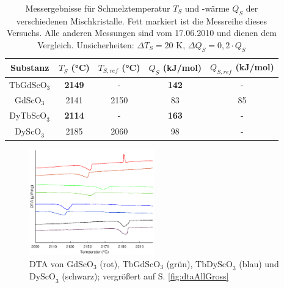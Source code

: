\documentclass[aps,twocolumn,secnumarabic,nobalancelastpage,amsmath,amssymb,
nofootinbib,superscriptaddress]{revtex4-1}
\begin{document}
\begin{table}[h]
\begin{ruledtabular}
\begin{tabular}{ccccc}
 Substanz & $T_S$ (°C) & $T_{S,ref}$ (°C) & $Q_S$ (kJ/mol) & $Q_{S,ref}$ (kJ/mol)\\
\hline
  \textbf{$\text{TbGdScO}_3$}  & \textbf{2149} & -    & \textbf{142} & -  \\
  $\text{GdScO}_3$    & 2141 & 2150 \cite{paperK} & 83  & 85 \\
  \textbf{$\text{DyTbScO}_3$}  & \textbf{2114} & -    & \textbf{163} & -  \\
  $\text{DyScO}_3$    & 2185 & 2060 \cite{meltpDyScO3} & 98  & - \\
\end{tabular}
\end{ruledtabular}
\caption{\label{tab:erg} Messergebnisse für Schmelztemperatur $T_S$ und -wärme $Q_S$ der verschiedenen Mischkristalle. Fett markiert ist die Messreihe dieses Versuchs.
Alle anderen Messungen sind vom 17.06.2010 und dienen dem Vergleich. Unsicherheiten: $\Delta T_S=20\text{ K}$, $\Delta Q_S=0,2\cdot Q_S$ }
\end{table}

\begin{figure}[h]
  \centering
   \includegraphics[width=0.48\textwidth]{../img/vglSkandate.eps}
  \caption{\label{fig:dtaAll} DTA von $\text{GdScO}_3$ (rot), $\text{TbGdScO}_3$ (grün), $\text{TbDyScO}_3$ (blau) und $\text{DyScO}_3$ (schwarz); vergrößert auf S. \ref{fig:dtaAllGross}}
\end{figure}
\end{document}
